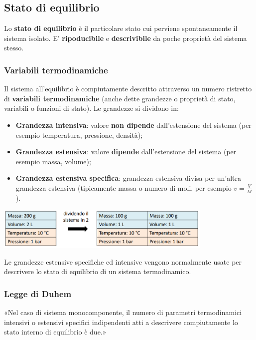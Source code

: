 \subsection{Stato di equilibrio}
Lo \textbf{stato di equilibrio} è il particolare stato cui perviene spontaneamente il sistema isolato.\newline
\newline
E' \textbf{ripoducibile} e \textbf{descrivibile} da poche proprietà del sistema stesso.
\subsubsection{Variabili termodinamiche}
Il sistema all’equilibrio è compiutamente descritto attraverso un numero ristretto di \textbf{variabili termodinamiche} (anche dette grandezze o proprietà di stato, variabili o funzioni di stato).\newline
\newline
Le grandezze si dividono in:
\begin{itemize}
    \item \textbf{Grandezza intensiva}: valore \textbf{non dipende} dall'estensione del sistema (per esempio temperatura, pressione, densità);
    \item \textbf{Grandezza estensiva}: valore \textbf{dipende} dall'estensione del sistema (per esempio massa, volume);
    \item \textbf{Grandezza estensiva specifica}: grandezza estensiva divisa per un'altra grandezza estensiva (tipicamente massa o numero di moli, per esempio $v = \frac{V}{M}$).
\end{itemize}
\begin{center}
    \includegraphics[height=2cm]{../L01/img1.PNG}
\end{center}
Le grandezze estensive specifiche ed intensive vengono normalmente usate per descrivere lo stato di equilibrio di un 
sistema termodinamico.
\subsubsection{Legge di Duhem}
«Nel caso di sistema monocomponente, il numero di parametri termodinamici intensivi o estensivi specifici indipendenti atti a descrivere compiutamente lo stato interno di equilibrio è due.»
